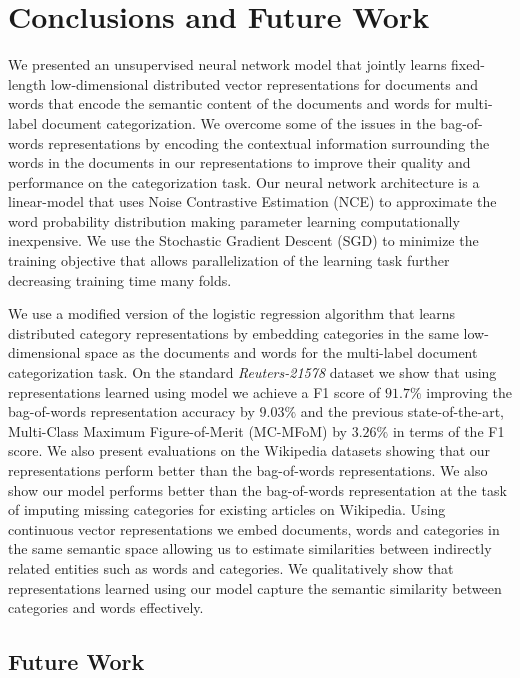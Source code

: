 \chapter{Conclusions and Future Work}
\label{chapter:conclusion}
We presented an unsupervised neural network model that jointly learns fixed-length low-dimensional distributed vector representations for documents and words that encode the semantic content of the documents and words for multi-label document categorization. 
We overcome some of the issues in the bag-of-words representations by encoding the contextual information surrounding the words in the documents in our representations to improve their quality and performance on the categorization task.
Our neural network architecture is a linear-model that uses Noise Contrastive Estimation (NCE) to approximate the word probability distribution making parameter learning computationally inexpensive. We use the Stochastic Gradient Descent (SGD) to minimize the training objective that allows parallelization of the learning task further decreasing training time many folds.

We use a modified version of the logistic regression algorithm that learns distributed category representations by embedding categories in the same low-dimensional space as the documents and words for the multi-label document categorization task. 
On the standard \emph{Reuters-21578} dataset we show that using representations learned using model we achieve a F1 score of $91.7\%$ improving the bag-of-words representation accuracy by $9.03\%$ and the previous state-of-the-art, Multi-Class Maximum Figure-of-Merit (MC-MFoM) by $3.26\%$ in terms of the F1 score. 
We also present evaluations on the Wikipedia datasets showing that our representations perform better than the bag-of-words representations. We also show our model performs better than the bag-of-words representation at the task of imputing missing categories for existing articles on Wikipedia.
Using continuous vector representations we embed documents, words and categories in the same semantic space allowing us to estimate similarities between indirectly related entities such as words and categories. We qualitatively show that representations learned using our model capture the semantic similarity between categories and words effectively.

\section{Future Work}

